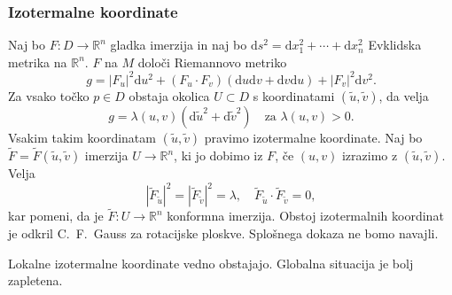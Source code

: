 \documentclass[8pt]{beamer}
\theoremstyle{definition}
\theoremstyle{remark}
\theoremstyle{plain}
\newtheorem{posledica}[definicija]{Posledica}
\numberwithin{equation}{section}  %
\begin{document}
%     
% 
%     

\begin{frame}
    \frametitle{Izotermalne koordinate}

    Naj bo $F: D \rightarrow \mathbb{R}^n$ gladka imerzija in naj bo $\mathrm{d} s^2=\mathrm{d} x_1^2+\cdots+\mathrm{d} x_n^2$ Evklidska metrika na $\mathbb{R}^n$. $F$ na $M$ določi \textcolor{red1}{Riemannovo metriko} 
    \begin{equation*}
        g=\left|F_u\right|^2 \mathrm{d} u^2+\left(F_u \cdot F_v\right)(\mathrm{d} u \mathrm{d} v+\mathrm{d} v \mathrm{d} u)+\left|F_v\right|^2 \mathrm{d} v^2.
    \end{equation*}
    \pause
    Za vsako točko $p \in D$ obstaja okolica $U \subset D$ s koordinatami $(\tilde{u}, \tilde{v})$, da velja 
    \begin{equation*}
        g=\lambda(u,v)\left(\mathrm{d} \tilde{u}^2+\mathrm{d} \tilde{v}^2\right) \quad \text{za } \lambda(u,v) > 0.
    \end{equation*}
    Vsakim takim koordinatam $(\tilde{u}, \tilde{v})$ pravimo \textcolor{red1}{izotermalne koordinate}. \pause Naj bo $\widetilde{F}=\widetilde{F}(\tilde{u}, \tilde{v})$ imerzija $U \rightarrow \mathbb{R}^n$, ki jo dobimo iz $F$, če $(u, v)$ izrazimo z $(\tilde{u}, \tilde{v})$. Velja 
    \begin{equation*}
        \left|\widetilde{F}_{\tilde{u}}\right|^2=\left|\widetilde{F}_{\tilde{v}}\right|^2=\lambda, \quad \widetilde{F}_{\tilde{u}} \cdot \widetilde{F}_{\tilde{v}}=0,
    \end{equation*}
    kar pomeni, da je $\widetilde{F}: U \rightarrow \mathbb{R}^n$ konformna imerzija. Obstoj izotermalnih koordinat je odkril C.~F.~Gauss za rotacijske ploskve. Splošnega dokaza ne bomo navajli.
    \pause 
    \vspace{0.8em}

    Lokalne izotermalne koordinate vedno obstajajo. \textcolor{red1}{Globalna situacija} je bolj zapletena. 
    
\end{frame}
\end{document}
